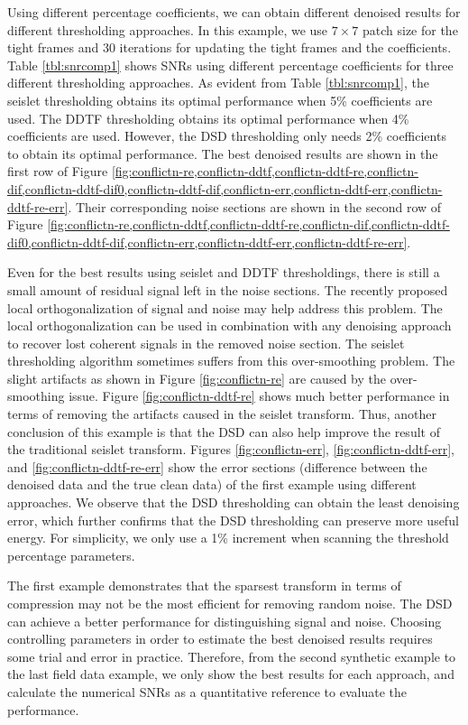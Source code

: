 Using different percentage coefficients, we can obtain different denoised results for different thresholding approaches. In this example, we use $7\times7$ patch size for the tight frames and  30 iterations for updating the tight frames and the coefficients. Table \ref{tbl:snrcomp1} shows SNRs using different percentage coefficients for three different thresholding approaches. As evident from Table \ref{tbl:snrcomp1}, the seislet thresholding obtains its optimal performance when 5\% coefficients are used. The DDTF thresholding obtains its optimal performance when 4\% coefficients are used. However, the DSD thresholding only needs 2\% coefficients to obtain its optimal performance. The best denoised results are shown in the first row of Figure \ref{fig:conflictn-re,conflictn-ddtf,conflictn-ddtf-re,conflictn-dif,conflictn-ddtf-dif0,conflictn-ddtf-dif,conflictn-err,conflictn-ddtf-err,conflictn-ddtf-re-err}. Their corresponding noise sections are shown in the second row of Figure \ref{fig:conflictn-re,conflictn-ddtf,conflictn-ddtf-re,conflictn-dif,conflictn-ddtf-dif0,conflictn-ddtf-dif,conflictn-err,conflictn-ddtf-err,conflictn-ddtf-re-err}.

Even for the best results using seislet and DDTF thresholdings, there is still a small amount of residual signal left in the noise sections. The recently proposed local orthogonalization of signal and noise \cite[]{yangkang2015ortho} may help address this problem. The local orthogonalization can be used in combination with any denoising approach to recover lost coherent signals in the removed noise section. The seislet thresholding algorithm sometimes suffers from this over-smoothing problem. The slight artifacts as shown in Figure \ref{fig:conflictn-re} are caused by the over-smoothing issue. Figure \ref{fig:conflictn-ddtf-re} shows much better performance in terms of removing the artifacts caused in the seislet transform. Thus, another conclusion of this example is that the DSD can also help improve the result of the traditional seislet transform. Figures \ref{fig:conflictn-err}, \ref{fig:conflictn-ddtf-err}, and \ref{fig:conflictn-ddtf-re-err} show the error sections (difference between the denoised data and the true clean data) of the first example using different approaches. We observe that the DSD thresholding can obtain the least denoising error, which further confirms that the DSD thresholding can preserve more useful energy. For simplicity, we only use a 1\%  increment when scanning the threshold percentage parameters.


The first example demonstrates that the sparsest transform in terms of compression may not be the most efficient for removing random noise. The DSD can achieve a better performance for distinguishing signal and noise. Choosing controlling parameters in order to estimate the best denoised results requires some trial and error in practice. Therefore, from the second synthetic example to the last field data example, we only show the best results for each approach, and calculate the numerical SNRs as a quantitative reference to evaluate the performance. 

